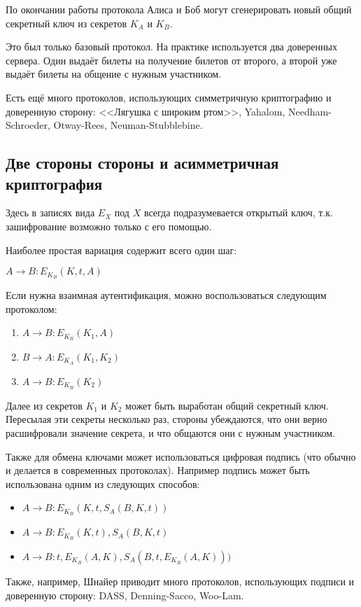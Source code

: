 По окончании работы протокола Алиса и Боб могут сгенерировать новый общий секретный ключ из секретов $K_A$ и $K_B$.

Это был только базовый протокол. На практике используется два доверенных сервера. Один выдаёт билеты на получение билетов от второго, а второй уже выдаёт билеты на общение с нужным участником.

Есть ещё много протоколов, использующих симметричную криптографию и доверенную сторону: <<Лягушка с широким ртом>>, Yahalom, Needham-Schroeder, Otway-Rees, Neuman-Stubblebine.

\subsection{Две стороны стороны и асимметричная криптография}

Здесь в записях вида $E_X$ под $X$ всегда подразумевается открытый ключ, т.к. зашифрование возможно только с его помощью.

Наиболее простая вариация содержит всего один шаг:

$A \rightarrow B: E_{K_B}(K, t, A)$

Если нужна взаимная аутентификация, можно воспользоваться следующим протоколом:

\begin{enumerate}
	\item $A \rightarrow B: E_{K_B}(K_1, A)$
	\item $B \rightarrow A: E_{K_A}(K_1, K_2)$
	\item $A \rightarrow B: E_{K_B}(K_2)$
\end{enumerate}

Далее из секретов $K_1$ и $K_2$ может быть выработан общий секретный ключ. Пересылая эти секреты несколько раз, стороны убеждаются, что они верно расшифровали значение секрета, и что общаются они с нужным участником. 

Также для обмена ключами может использоваться цифровая подпись (что обычно и делается в современных протоколах). Например подпись может быть использована одним из следующих способов:

\begin{itemize}
	\item $A \rightarrow B: E_{K_B}(K, t, S_A(B, K, t))$
	\item $A \rightarrow B: E_{K_B}(K, t), S_A(B, K, t)$
	\item $A \rightarrow B: t, E_{K_B}(A, K), S_A(B, t, E_{K_B}(A, K)))$
\end{itemize}

Также, например, Шнайер приводит много протоколов, использующих подписи и доверенную сторону: DASS, Denning-Sacco, Woo-Lam.